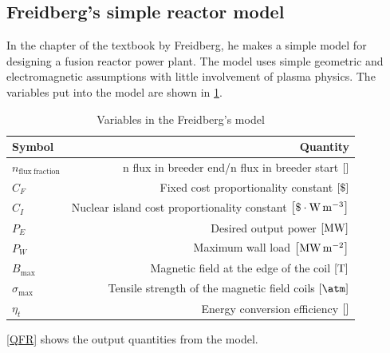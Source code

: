 \subsection{Freidberg's simple reactor model}
In the  chapter of the textbook by Freidberg\cite{freidberg_plasma_2007}, he makes a simple model for designing a fusion reactor power plant.
The model uses simple geometric and electromagnetic assumptions with little involvement of plasma physics. The variables put into the model are shown in \cref{VFR}.
\begin{table}
	\centering
	\begin{tabular}{lr}
		\toprule
		Symbol                         & Quantity                                                                                 \\
		\midrule
		\(n_\mathrm{flux \ fraction}\) & n flux in breeder end/n flux in breeder start \(\bqty{}\)                                \\
		\(C_F\)                        & Fixed cost proportionality constant \(\bqty{\$}\)                                         \\
		\(C_I\)                        & Nuclear island cost proportionality constant \(\bqty{\$\cdot\si{\watt\per\meter\cubed}}\) \\
		\(P_E\)                        & Desired output power \(\bqty{\si{\mega\watt}}\)                                          \\
		\(P_W\)                        & Maximum wall load \(\bqty{\si{\mega\watt\per\meter\squared}}\)                           \\
		\(B_{\max}\)                   & Magnetic field at the edge of the coil \(\bqty{\si{\tesla}}\)                            \\
		\(\sigma_{\max}\)              & Tensile strength of the magnetic field coils \(\bqty{\si{\atm}}\)                        \\
		\(\eta_t\)                     & Energy conversion efficiency \(\bqty{}\)                                                 \\
		\bottomrule
	\end{tabular}
	\caption{Variables in the Freidberg's model}
	\label{VFR}
\end{table}
\cref{QFR} shows the output quantities from the model.
